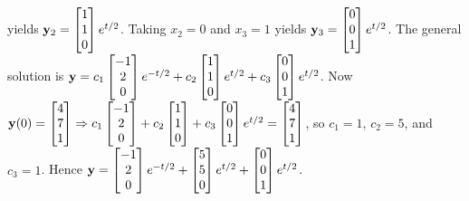 \documentclass{ximera}
\begin{document}
\begin{problem}
\begin{solution}
yields
${\bf y}_2=  \begin{bmatrix}1\\1\\0
 \end{bmatrix}e^{t/2}$.
Taking $x_2=0$ and $x_3=1$ yields
${\bf y}_3=  \begin{bmatrix}0\\0\\1
 \end{bmatrix}e^{t/2}$.
 The general solution is
${\bf y}= c_1 \begin{bmatrix}-1\\2\\0\end{bmatrix}e^{-t/2}+
c_2 \begin{bmatrix}1\\1\\0\end{bmatrix}e^{t/2}+c_3 \begin{bmatrix}0\\0\\1\end{bmatrix}e^{t/2}$.
Now ${\bf y}(0)=  \begin{bmatrix}4\\7\\1\end{bmatrix}\Rightarrow
 c_1 \begin{bmatrix}-1\\2\\0\end{bmatrix}+
c_2 \begin{bmatrix}1\\1\\0\end{bmatrix}+c_3 \begin{bmatrix}0\\0\\1\end{bmatrix}e^{t/2}=  \begin{bmatrix}4\\7\\1\end{bmatrix}$,
so $c_1=1$, $c_2=5$, and $c_3=1$. Hence
${\bf y}=  \begin{bmatrix}-1\\2\\0\end{bmatrix}e^{-t/2}+
 \begin{bmatrix}5\\5\\0\end{bmatrix}e^{t/2}+ \begin{bmatrix}0\\0\\1\end{bmatrix}e^{t/2}$.
\end{solution}
\end{problem}
\end{document}
